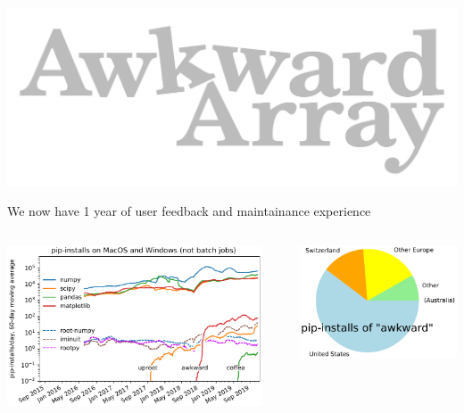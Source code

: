\documentclass[aspectratio=169]{beamer}
\begin{document}
\begin{frame}{\mbox{ }}
\vspace{0.5 cm}
\begin{center}
\includegraphics[width=0.5\linewidth]{awkward-logo.pdf}
\end{center}
\end{frame}

\begin{frame}{We now have 1 year of user feedback and maintainance experience}
\large
\vspace{0.5 cm}

\begin{columns}
\includegraphics[width=\linewidth]{pip-timeline.pdf}

\vspace{0.1 cm}
\centering \textcolor{darkblue}{}

\hfill\includegraphics[width=0.8\linewidth]{pip-country-awkward.pdf}


\end{columns}
\end{frame}
\end{document}
